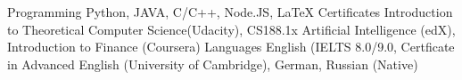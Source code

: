 \begin{cvskills}
  \cvskill
    {Programming}
    {Python, JAVA, C/C++, Node.JS, \LaTeX}
  \cvskill
    {Certificates}
    {Introduction to Theoretical Computer Science(Udacity), CS188.1x Artificial Intelligence (edX), Introduction to Finance (Coursera)}
  \cvskill
    {Languages}
    {English (IELTS 8.0/9.0, Certficate in Advanced English (University of Cambridge), German, Russian (Native)}
\end{cvskills}
